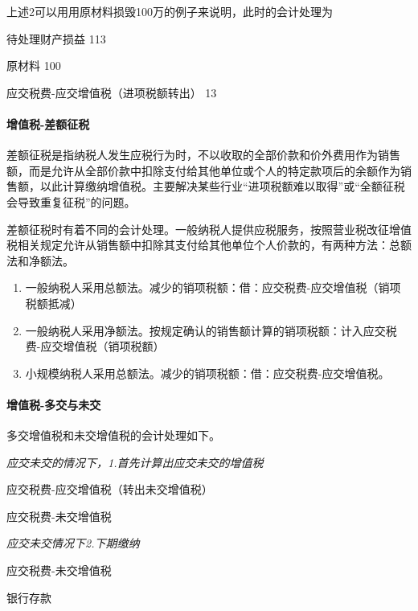 \documentclass[UTF8,12pt]{ctexart}
\newenvironment{Dr}{%
	\begin{list}{}%
		{
			\setlength{\leftmargin}{2em}
			\setlength{\labelwidth}{2em}
			\setlength{\labelsep}{0pt}
			\setlength{\itemindent}{0pt}
			\setlength{\listparindent}{0pt}
			\setlength{\parsep}{0pt}
			\setlength{\topsep}{0pt}
		}
		\item[\textbf{借：}]
	}{%
	\end{list}
}
\newenvironment{Cr}{%
	\begin{list}{}%
		{
			\setlength{\leftmargin}{3em}
			\setlength{\labelwidth}{2em}
			\setlength{\labelsep}{0pt}
			\setlength{\itemindent}{0pt}
			\setlength{\listparindent}{0pt}
			\setlength{\parsep}{0pt}
			\setlength{\topsep}{0pt}
		}
		\item[\textbf{贷：}]
	}{%
	\end{list}
}
\numberwithin{equation}{section} %
\numberwithin{figure}{section}
\numberwithin{table}{section}
\begin{document}
	上述2可以用用原材料损毁100万的例子来说明，此时的会计处理为
	
	\begin{Dr}
		待处理财产损益 113
	\end{Dr}
	\begin{Cr}
		原材料 100
		
		应交税费-应交增值税（进项税额转出） 13
	\end{Cr}

	\paragraph{增值税-差额征税}
	差额征税是指纳税人发生应税行为时，不以收取的全部价款和价外费用作为销售额，而是允许从全部价款中扣除支付给其他单位或个人的特定款项后的余额作为销售额，以此计算缴纳增值税。主要解决某些行业“进项税额难以取得”或“全额征税会导致重复征税”的问题。
	
	差额征税时有着不同的会计处理。一般纳税人提供应税服务，按照营业税改征增值税相关规定允许从销售额中扣除其支付给其他单位个人价款的，有两种方法：总额法和净额法。
	
	\begin{enumerate}
		\item 一般纳税人采用总额法。减少的销项税额：借：应交税费-应交增值税（销项税额抵减）
		
		\item 一般纳税人采用净额法。按规定确认的销售额计算的销项税额：计入应交税费-应交增值税（销项税额）
		
		\item 小规模纳税人采用总额法。减少的销项税额：借：应交税费-应交增值税。
	\end{enumerate}

	\paragraph{增值税-多交与未交}多交增值税和未交增值税的会计处理如下。
	
	\textit{应交未交的情况下，1.首先计算出应交未交的增值税}
	
	\begin{Dr}
		应交税费-应交增值税（转出未交增值税）
	\end{Dr}
	\begin{Cr}
		应交税费-未交增值税
	\end{Cr}
	
	\textit{应交未交情况下2.下期缴纳}
	
	\begin{Dr}
		应交税费-未交增值税
	\end{Dr}
	\begin{Cr}
		银行存款
	\end{Cr}
\end{document}
